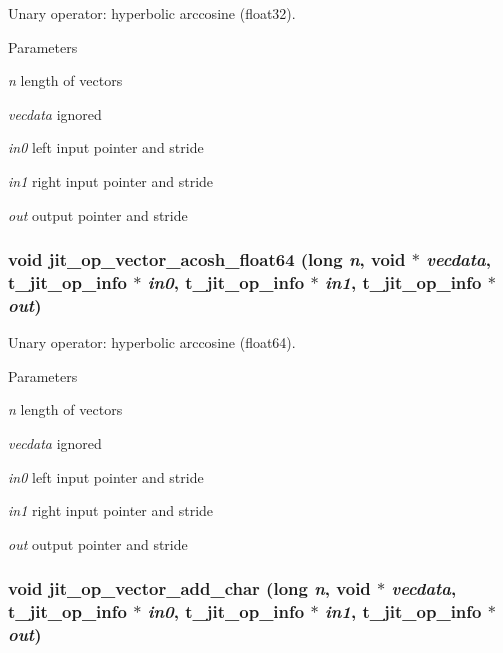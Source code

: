Unary operator: hyperbolic arccosine (float32). 
\begin{DoxyParams}{Parameters}
\item[{\em n}]length of vectors \item[{\em vecdata}]ignored \item[{\em in0}]left input pointer and stride \item[{\em in1}]right input pointer and stride \item[{\em out}]output pointer and stride \end{DoxyParams}
\hypertarget{group__opvecmod_gad0984d6a7094705a0dc5aa10f890f8b9}{
\subsubsection[{jit\_\-op\_\-vector\_\-acosh\_\-float64}]{\setlength{\rightskip}{0pt plus 5cm}void jit\_\-op\_\-vector\_\-acosh\_\-float64 (long {\em n}, \/  void $\ast$ {\em vecdata}, \/  {\bf t\_\-jit\_\-op\_\-info} $\ast$ {\em in0}, \/  {\bf t\_\-jit\_\-op\_\-info} $\ast$ {\em in1}, \/  {\bf t\_\-jit\_\-op\_\-info} $\ast$ {\em out})}}
\label{group__opvecmod_gad0984d6a7094705a0dc5aa10f890f8b9}


Unary operator: hyperbolic arccosine (float64). 
\begin{DoxyParams}{Parameters}
\item[{\em n}]length of vectors \item[{\em vecdata}]ignored \item[{\em in0}]left input pointer and stride \item[{\em in1}]right input pointer and stride \item[{\em out}]output pointer and stride \end{DoxyParams}
\hypertarget{group__opvecmod_gae0c74f1dda1702a203be0581ae2a9e3e}{
\subsubsection[{jit\_\-op\_\-vector\_\-add\_\-char}]{\setlength{\rightskip}{0pt plus 5cm}void jit\_\-op\_\-vector\_\-add\_\-char (long {\em n}, \/  void $\ast$ {\em vecdata}, \/  {\bf t\_\-jit\_\-op\_\-info} $\ast$ {\em in0}, \/  {\bf t\_\-jit\_\-op\_\-info} $\ast$ {\em in1}, \/  {\bf t\_\-jit\_\-op\_\-info} $\ast$ {\em out})}}
\label{group__opvecmod_gae0c74f1dda1702a203be0581ae2a9e3e}


